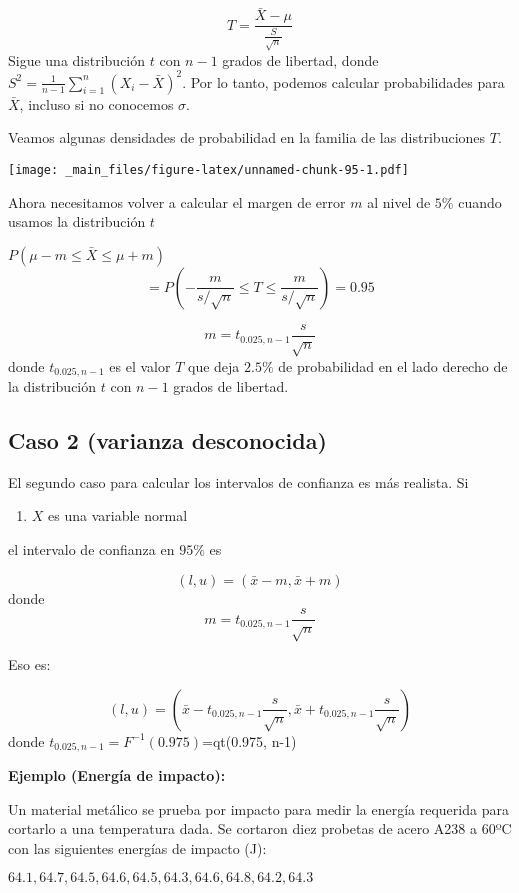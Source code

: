 \documentclass[
]{book}
\providecommand{\tightlist}{%
  \setlength{\itemsep}{0pt}\setlength{\parskip}{0pt}}
\begin{document}
\[T=\frac{\bar{X}-\mu}{\frac{S}{\sqrt{n}}}\]
Sigue una distribución \(t\) con \(n-1\) grados de libertad, donde \(S^2=\frac{1}{n-1} \sum_{i=1}^n (X_i-\bar{X})^2\). Por lo tanto, podemos calcular probabilidades para \(\bar{X}\), incluso si no conocemos \(\sigma\).

Veamos algunas densidades de probabilidad en la familia de las distribuciones \(T\).

\texttt{[image: \_main\_files/figure-latex/unnamed-chunk-95-1.pdf]}

Ahora necesitamos volver a calcular el margen de error \(m\) al nivel de \(5\%\) cuando usamos la distribución \(t\)

\(P(\mu-m \leq \bar{X} \leq\mu + m)\)
\[=P(-\frac{m}{s/\sqrt{n}} \leq T \leq\frac{m}{s/\sqrt{n}})=0.95\]

\[m=t_{0.025, n-1} \frac{s}{\sqrt{n}}\]
donde \(t_{0.025, n-1}\) es el valor \(T\) que deja \(2.5\%\) de probabilidad en el lado derecho de la distribución \(t\) con \(n-1\) grados de libertad.

\hypertarget{caso-2-varianza-desconocida}{%
\subsection{Caso 2 (varianza desconocida)}\label{caso-2-varianza-desconocida}}

El segundo caso para calcular los intervalos de confianza es más realista. Si

\begin{enumerate}
\def\labelenumi{\arabic{enumi}.}
\tightlist
\item
  \(X\) es una variable normal
\end{enumerate}

el intervalo de confianza en \(95\%\) es

\[(l,u)=(\bar{x} - m, \bar{x} + m)\]
donde \[m=t_{0.025, n-1} \frac{s}{\sqrt{n}}\]

Eso es:

\[(l,u)=(\bar{x} - t_{0.025, n-1} \frac{s}{\sqrt{n}}, \bar{x} + t_{0.025, n-1} \frac{s}{\sqrt{n}})\]
donde \(t_{0.025, n-1}=F^{-1}(0.975)\)=qt(0.975, n-1)

\textbf{Ejemplo (Energía de impacto):}

Un material metálico se prueba por impacto para medir la energía requerida para cortarlo a una temperatura dada. Se cortaron diez probetas de acero A238 a 60ºC con las siguientes energías de impacto (J):

\(64.1, 64.7, 64.5, 64.6, 64.5, 64.3, 64.6, 64.8, 64.2, 64.3\)
\end{document}
